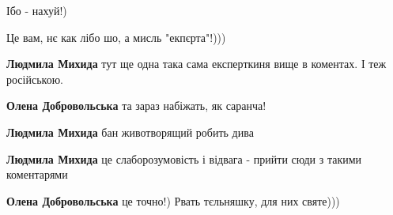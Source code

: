  
Ібо - нахуй!)

 
Це вам, нє как лібо шо, а мисль "екпєрта"!)))

\begin{itemize} %
 
\textbf{Людмила Михида} тут ще одна така сама експерткиня вище в коментах. І теж російською.

 
\textbf{Олена Добровольська} та зараз набіжать, як саранча!

 
\textbf{Людмила Михида} бан животворящий робить дива

 
\textbf{Людмила Михида} це слаборозумовість і відвага - прийти сюди з такими коментарями

 
\textbf{Олена Добровольська} це точно!)
Рвать тєльняшку, для них святе)))
\end{itemize} %

